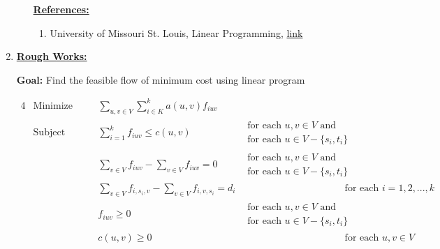 \documentclass[12pt]{article}
\begin{document}
\begin{enumerate}[1.]
\begin{itemize}
        \underline{\textbf{References:}}

        \bigskip

        \begin{enumerate}[1)]
            \item University of Missouri St. Louis, Linear Programming, \href{http://umsl.edu/~adhikarib/cs4130-fall2017/slides/10%20-%20Linear%20Programming.pdf}{link}
        \end{enumerate}
    \end{itemize}

    \item

    \bigskip

    \underline{\textbf{Rough Works:}}

    \bigskip

    \textbf{Goal:} Find the feasible flow of minimum cost using linear program

    \bigskip

    \begin{alignat*}{4}
        & \text{Minimize}   & \quad & \sum\limits_{u,v \in V} \sum\limits_{i \in K}^k a(u,v)f_{iuv} & \\
        & \text{Subject to} &       & \sum\limits_{i = 1}^k f_{iuv} \leq c(u,v) &\begin{split}\text{for each $u,v \in V$ and}\\\text{for each $u \in V - \{s_i,t_i\}$}\end{split}\\
        &                   &       & \sum\limits_{v \in V} f_{iuv} - \sum\limits_{v \in V} f_{iuv} = 0 & \begin{split}\text{for each $u,v \in V$ and}\\\text{for each $u \in V - \{s_i,t_i\}$}\end{split}\\
        &                   &       & \sum\limits_{v \in V} f_{i,s_i,v} - \sum\limits_{v \in V} f_{i,v,s_i} = d_i && \text{for each $i = 1,2,...,k$}\\
        &                   &       & f_{iuv} \geq 0 &\begin{split}\text{for each $u,v \in V$ and}\\\text{for each $u \in V - \{s_i,t_i\}$}\end{split}\\
        &                   &       & c(u,v) \geq 0 &&\text{for each $u,v \in V$}\\
    \end{alignat*}


\end{enumerate}
\end{document}
